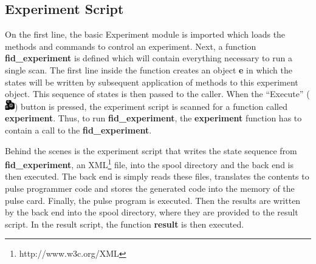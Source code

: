 \documentclass[12pt, a4paper, BCOR10mm, twoside, titlepage, headinclude]{scrbook}
\begin{document}
\subsection{Experiment Script}

On the first line, the basic Experiment module is imported which loads the methods and commands to control an experiment. Next, a function \textbf{fid\_experiment} is defined which will contain everything necessary to run a single scan.
The first line inside the function creates an object \textbf{e} in which the states will be written by subsequent application of methods to this experiment object. This sequence of states is then passed to the caller.
When the ``Execute'' (\includegraphics[keepaspectratio, height=12pt]{execute_button}) button is pressed, the experiment script is scanned for a function called \textbf{experiment}.
Thus, to run \textbf{fid\_experiment}, the \textbf{experiment} function has to contain a call to the \textbf{fid\_experiment}. 

Behind the scenes is the experiment script that writes the state sequence from \textbf{fid\_experiment}, an \textsf{XML}\footnote{http://www.w3c.org/XML} file, into the spool directory and the back end is then executed. The back end is simply reads these files, translates  the contents to pulse programmer code and stores the generated code into the memory of the pulse card. Finally, the pulse program is executed. Then the results are written by the back end into the spool directory, where they are provided to the result script. In the result script, the function \textbf{result} is then executed.%
\end{document}
